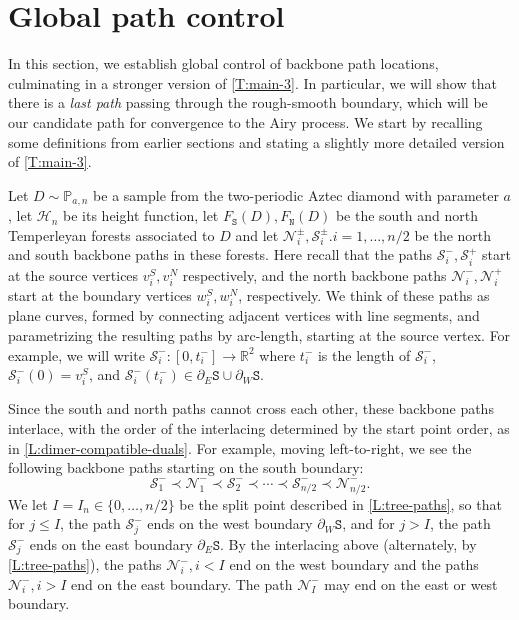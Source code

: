 \documentclass[11pt,twoside]{amsart}
\theoremstyle{plain}
\numberwithin{quest}{section}
\theoremstyle{remark}
\numberwithin{rem}{section}
\theoremstyle{definition}
\newcommand{\R}{\mathbb{R}}
\renewcommand{\P}{\mathbb{P}}
\newcommand{\cS}{\mathcal{S}}
\newcommand{\cN}{\mathcal{N}}
\newcommand{\cH}{\mathcal{H}}
\renewcommand{\tt}[1]{{\mathtt{#1}}}
\begin{document}
	
	\section{Global path control}
	\label{S:global-control}
	
	In this section, we establish global control of backbone path locations, culminating in a stronger version of \cref{T:main-3}. In particular, we will show that there is a \textit{last path} passing through the rough-smooth boundary, which will be our candidate path for convergence to the Airy process. We start by recalling some definitions from earlier sections and stating a slightly more detailed version of \cref{T:main-3}.
	
	Let $D \sim \P_{a, n}$ be a sample from the two-periodic Aztec diamond with parameter $a$, let $\cH_n$ be its height function, let $F_\tt{S}(D), F_\tt{N}(D)$ be the south and north Temperleyan forests associated to $D$ and let $\cN_i^\pm, \cS_i^\pm. i = 1, \dots, n/2$ be the north and south backbone paths in these forests. Here recall that the paths $\cS_i^-, \cS_i^+$ start at the source vertices $v^S_i, v^N_i$ respectively, and the north backbone paths $\cN_i^-, \cN_i^+$ start at the boundary vertices $w^S_i, w^N_i$, respectively. We think of these paths as plane curves, formed by connecting adjacent vertices with line segments, and parametrizing the resulting paths by arc-length, starting at the source vertex. For example, we will write $\cS_i^-:[0, t_i^-] \to \R^2$ where $t_i^-$ is the length of $\cS_i^-$, $\cS_i^-(0) = v^S_i$, and $\cS_i^-(t_i^-) \in \partial_{E} \tt{S} \cup \partial_{W} \tt{S}$.
	
	Since the south and north paths cannot cross each other, these backbone paths interlace, with the order of the interlacing determined by the start point order, as in \cref{L:dimer-compatible-duals}. For example, moving left-to-right, we see the following backbone paths starting on the south boundary:
	$$
	\cS_1^- \prec \cN_1^- \prec \cS_2^- \prec \cdots \prec \cS_{n/2}^- \prec \cN_{n/2}^-.
	$$
	We let $I = I_n \in \{0, \dots, n/2\}$ be the split point described in \cref{L:tree-paths}, so that for $j \le I$, the path $\cS_j^-$ ends on the west boundary $\partial_W \tt{S}$, and for $j > I$, the path $\cS_j^-$ ends on the east boundary $\partial_E \tt{S}$. By the interlacing above (alternately, by \cref{L:tree-paths}), the paths $\cN_i^-, i < I$ end on the west boundary and the paths $\cN_i^-, i > I$ end on the east boundary. The path $\cN_I^-$ may end on the east or west boundary.
	
\end{document}
